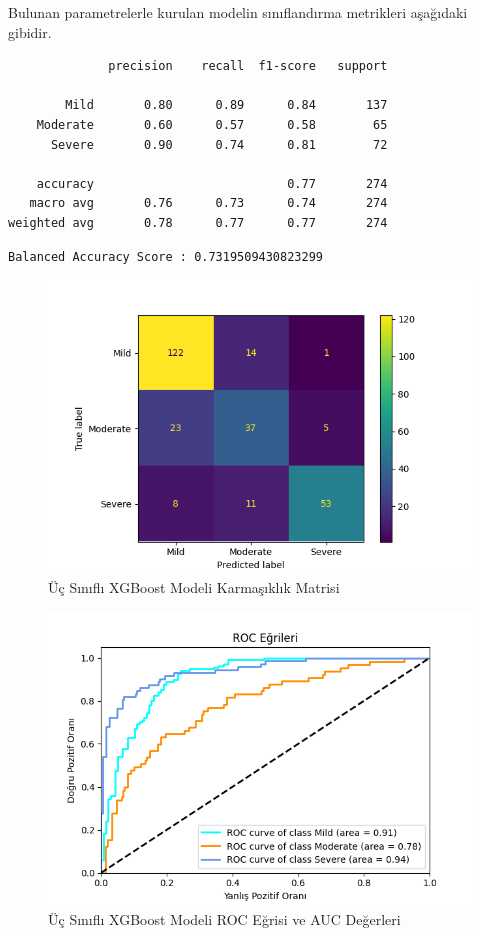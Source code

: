 \documentclass[12pt,twoside]{deuthesis}
\begin{document}
Bulunan parametrelerle kurulan modelin sınıflandırma metrikleri aşağıdaki gibidir.
\begin{verbatim}
              precision    recall  f1-score   support

        Mild       0.80      0.89      0.84       137
    Moderate       0.60      0.57      0.58        65
      Severe       0.90      0.74      0.81        72

    accuracy                           0.77       274
   macro avg       0.76      0.73      0.74       274
weighted avg       0.78      0.77      0.77       274
\end{verbatim}
\begin{verbatim}
Balanced Accuracy Score : 0.7319509430823299
\end{verbatim}
\begin{figure}

{\centering \includegraphics[width=1.05\linewidth,height=0.6\textheight]{figure/xgb_conf} 

}

\caption{Üç Sınıflı XGBoost Modeli Karmaşıklık Matrisi}\label{fig:unnamed-chunk-40}
\end{figure}
\begin{figure}

{\centering \includegraphics[width=1.05\linewidth,height=0.6\textheight]{figure/roc_curve_XGBClassifier} 

}

\caption{Üç Sınıflı XGBoost Modeli ROC Eğrisi ve AUC Değerleri}\label{fig:unnamed-chunk-41}
\end{figure}
\end{document}
